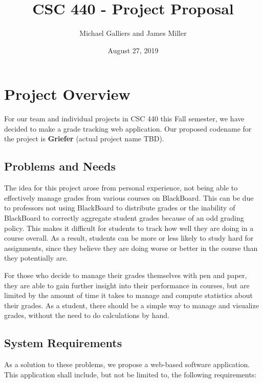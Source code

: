 \documentclass[12pt]{article}
\author{Michael Galliers and James Miller}
\title{CSC 440 - Project Proposal}
\date{August 27, 2019}
\begin{document}
\begin{titlepage}
\maketitle
\end{titlepage}

\newpage
    \tableofcontents
\newpage

\section{Project Overview}
For our team and individual projects in CSC 440 this Fall semester, we have decided to make a grade
tracking web application. Our proposed codename for the project is \textbf{Griefer} (actual project
name TBD).

\subsection{Problems and Needs}
The idea for this project arose from personal experience, not being able to effectively manage
grades from various courses on BlackBoard. This can be due to professors not using BlackBoard to
distribute grades or the inability of BlackBoard to correctly aggregate student grades because of
an odd grading policy. This makes it difficult for students to track how well they are doing in a
course overall. As a result, students can be more or less likely to study hard for assignments,
since they believe they are doing worse or better in the course than they potentially are.

For those who decide to manage their grades themselves with pen and paper, they are able to gain
further insight into their performance in courses, but are limited by the amount of time it takes to
manage and compute statistics about their grades. As a student, there should be a simple way to
manage and visualize grades, without the need to do calculations by hand.

\subsection{System Requirements}
As a solution to these problems, we propose a web-based software application. This application shall
include, but not be limited to, the following requirements:
\end{document}
